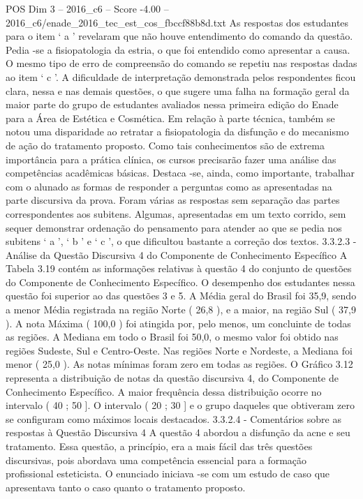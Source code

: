 \begin{textsample}{POS Dim 3 – 2016\_c6 – Score -4.00 – 2016\_c6/enade\_2016\_tec\_est\_cos\_fbccf88b8d.txt}
As respostas dos estudantes para o item ‘ a ’ revelaram que não houve entendimento do comando da questão.
Pedia -se a fisiopatologia da estria, o que foi entendido como apresentar a causa.
O mesmo tipo de erro de compreensão do comando se repetiu nas respostas dadas ao item ‘ c ’.
A dificuldade de interpretação demonstrada pelos respondentes ficou clara, nessa e nas demais questões, o que sugere uma falha na formação geral da maior parte do grupo de estudantes avaliados nessa primeira edição do Enade para a Área de Estética e Cosmética.
Em relação à parte técnica, também se notou uma disparidade ao retratar a fisiopatologia da disfunção e do mecanismo de ação do tratamento proposto.
Como tais conhecimentos são de extrema importância para a prática clínica, os cursos precisarão fazer uma análise das competências acadêmicas básicas.
Destaca -se, ainda, como importante, trabalhar com o alunado as formas de responder a perguntas como as apresentadas na parte discursiva da prova.
Foram várias as respostas sem separação das partes correspondentes aos subitens.
Algumas, apresentadas em um texto corrido, sem sequer demonstrar ordenação do pensamento para atender ao que se pedia nos subitens ‘ a ’, ‘ b ’ e ‘ c ’, o que dificultou bastante a correção dos textos. 3.3.2.3 - Análise da Questão Discursiva 4 do Componente de Conhecimento Específico A Tabela 3.19 contém as informações relativas à questão 4 do conjunto de questões do Componente de Conhecimento Específico.
O desempenho dos estudantes nessa questão foi superior ao das questões 3 e 5.
A Média geral do Brasil foi 35,9, sendo a menor Média registrada na região Norte ( 26,8 ), e a maior, na região Sul ( 37,9 ).
A nota Máxima ( 100,0 ) foi atingida por, pelo menos, um concluinte de todas as regiões.
A Mediana em todo o Brasil foi 50,0, o mesmo valor foi obtido nas regiões Sudeste, Sul e Centro-Oeste.
Nas regiões Norte e Nordeste, a Mediana foi menor ( 25,0 ).
As notas mínimas foram zero em todas as regiões.
O Gráfico 3.12 representa a distribuição de notas da questão discursiva 4, do Componente de Conhecimento Específico.
A maior frequência dessa distribuição ocorre no intervalo ( 40 ; 50 ].
O intervalo ( 20 ; 30 ] e o grupo daqueles que obtiveram zero se configuram como máximos locais destacados. 3.3.2.4 - Comentários sobre as respostas à Questão Discursiva 4 A questão 4 abordou a disfunção da acne e seu tratamento.
Essa questão, a princípio, era a mais fácil das três questões discursivas, pois abordava uma competência essencial para a formação profissional esteticista.
O enunciado iniciava -se com um estudo de caso que apresentava tanto o caso quanto o tratamento proposto.

\end{textsample}
